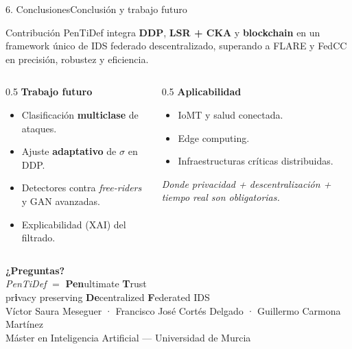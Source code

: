 \begin{frame}{6. Conclusiones}{Conclusión y trabajo futuro}
  \begin{block}{Contribución}
    PenTiDef integra \textbf{DDP}, \textbf{LSR + CKA} y \textbf{blockchain} en un framework único de IDS federado descentralizado, superando a FLARE y FedCC en precisión, robustez y eficiencia.
  \end{block}
  \vfill
  \begin{columns}[T]
    \begin{column}{0.5\textwidth}
      \textbf{Trabajo futuro}
      \begin{itemize}\small
        \item Clasificación \textbf{multiclase} de ataques.
        \item Ajuste \textbf{adaptativo} de $\sigma$ en DDP.
        \item Detectores contra \textit{free-riders} y GAN avanzadas.
        \item Explicabilidad (XAI) del filtrado.
      \end{itemize}
    \end{column}
    \begin{column}{0.5\textwidth}
      \textbf{Aplicabilidad}
      \begin{itemize}\small
        \item IoMT y salud conectada.
        \item Edge computing.
        \item Infraestructuras críticas distribuidas.
      \end{itemize}
      \vspace{0.3em}
      \textit{Donde privacidad + descentralización + tiempo real son obligatorias.}
    \end{column}
  \end{columns}
\end{frame}

\begin{frame}[plain]
  \begin{center}
    \vspace{1.2cm}
    {\Huge \color{UMUblue} \textbf{¿Preguntas?}}\\[1.2cm]
    \textit{PenTiDef} $=$ \textbf{Pen}ultimate \textbf{T}rust \\
    pr\textbf{i}vacy preserving \textbf{De}centralized \textbf{F}ederated IDS \\[1.2cm]
    \small
    Víctor Saura Meseguer · Francisco José Cortés Delgado · Guillermo Carmona Martínez \\[0.4cm]
    Máster en Inteligencia Artificial — Universidad de Murcia
  \end{center}
\end{frame}
